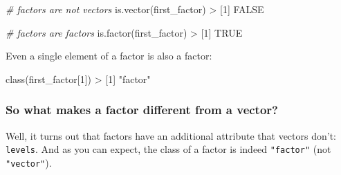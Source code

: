 \documentclass[
]{book}
\newenvironment{Shaded}{\begin{snugshade}}{\end{snugshade}}
\newcommand{\CommentTok}[1]{\textcolor[rgb]{0.56,0.35,0.01}{\textit{#1}}}
\newcommand{\ConstantTok}[1]{\textcolor[rgb]{0.00,0.00,0.00}{#1}}
\newcommand{\DecValTok}[1]{\textcolor[rgb]{0.00,0.00,0.81}{#1}}
\newcommand{\ErrorTok}[1]{\textcolor[rgb]{0.64,0.00,0.00}{\textbf{#1}}}
\newcommand{\FunctionTok}[1]{\textcolor[rgb]{0.00,0.00,0.00}{#1}}
\newcommand{\NormalTok}[1]{#1}
\newcommand{\SpecialCharTok}[1]{\textcolor[rgb]{0.00,0.00,0.00}{#1}}
\newcommand{\StringTok}[1]{\textcolor[rgb]{0.31,0.60,0.02}{#1}}
\begin{document}
\begin{Shaded}
\begin{Highlighting}[]
\CommentTok{\# factors are not vectors}
\FunctionTok{is.vector}\NormalTok{(first\_factor)}
\SpecialCharTok{\textgreater{}}\NormalTok{ [}\DecValTok{1}\NormalTok{] }\ConstantTok{FALSE}

\CommentTok{\# factors are factors}
\FunctionTok{is.factor}\NormalTok{(first\_factor)}
\SpecialCharTok{\textgreater{}}\NormalTok{ [}\DecValTok{1}\NormalTok{] }\ConstantTok{TRUE}
\end{Highlighting}
\end{Shaded}

Even a single element of a factor is also a factor:

\begin{Shaded}
\begin{Highlighting}[]
\FunctionTok{class}\NormalTok{(first\_factor[}\DecValTok{1}\NormalTok{])}
\SpecialCharTok{\textgreater{}}\NormalTok{ [}\DecValTok{1}\NormalTok{] }\StringTok{"factor"}
\end{Highlighting}
\end{Shaded}

\hypertarget{so-what-makes-a-factor-different-from-a-vector}{%
\subsubsection*{So what makes a factor different from a vector?}\label{so-what-makes-a-factor-different-from-a-vector}}

Well, it turns out that factors have an additional attribute that vectors don't:
\texttt{levels}. And as you can expect, the class of a factor is indeed \texttt{"factor"}
(not \texttt{"vector"}).

\begin{Shaded}
\end{Shaded}
\end{document}
